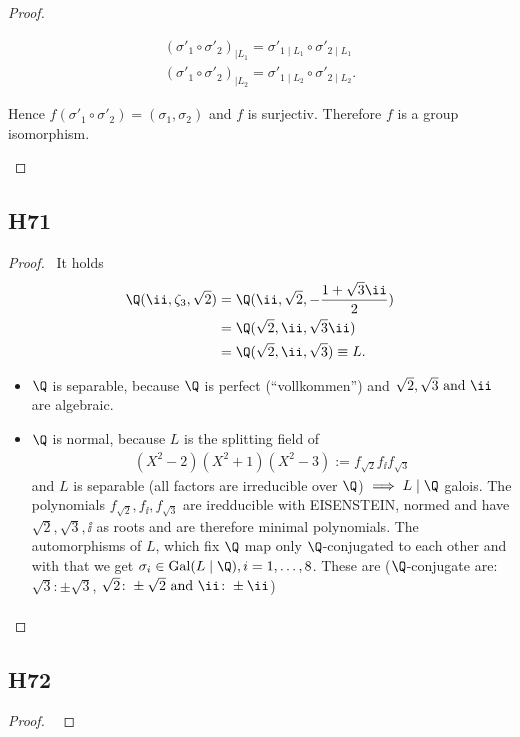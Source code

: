 \begin{proof}
\begin{itemize}
\begin{itemize}
			\begin{align*}
				(\sigma'_1 \circ \sigma'_2)_{\mid L_1} = \sigma'_{1\mid L_1} \circ \sigma'_{2\mid L_1}\\
				(\sigma'_1 \circ \sigma'_2)_{\mid L_2} = \sigma'_{1\mid L_2} \circ \sigma'_{2\mid L_2}.
			\end{align*}
		\end{itemize}
	Hence $f(\sigma'_1 \circ \sigma'_2) = (\sigma_1, \sigma_2)$ and $f$ is surjectiv. Therefore $f$ is a group isomorphism.
	\end{itemize}
\end{proof}

\subsection{H71}
\begin{proof}\
	It holds
	\begin{align*}
		\Q(\ii, \zeta_3, \sqrt{2}) &= \Q(\ii, \sqrt{2}, - \frac{1+\sqrt{3}\ii}{2})\\
		&= \Q(\sqrt{2}, \ii, \sqrt{3}\ii)\\
		&= \Q(\sqrt{2}, \ii, \sqrt{3}) \equiv L. 
	\end{align*}
	\begin{itemize}
		\item $\Q$ is separable, because $\Q$ is perfect (``vollkommen'') and $\sqrt{2}, \sqrt{3} \and \ii$ are algebraic.
		\item $\Q$ is normal, because $L$ is the splitting field of
		\begin{align*}
			(X^2 -2)(X^2+1)(X^2-3) := f_{\sqrt{2}}f_{\ii}f_{\sqrt{3}}
		\end{align*}
		and $L$ is separable (all factors are irreducible over $\Q$) $\implies L \mid \Q$ galois. The polynomials $f_{\sqrt{2}},f_{\ii},f_{\sqrt{3}}$ are iredducible with EISENSTEIN, normed and have $\sqrt{2},\sqrt{3}, \ii$ as roots and are therefore minimal polynomials. The automorphisms of $L$, which fix $\Q$ map only $\Q$-conjugated to each other and with that we get $\sigma_i \in \Gal(L\mid \Q), i =1,\dots,8$. These are ($\Q$-conjugate are: $\sqrt{3}\colon \pm \sqrt{3}$, $\sqrt{2}\colon \pm \sqrt{2} \and \ii\colon \pm \ii$)
		\begin{align*}
			
			
		\end{align*}
		
	\end{itemize}
\end{proof}

\subsection{H72}
\begin{proof}\
	
\end{proof}